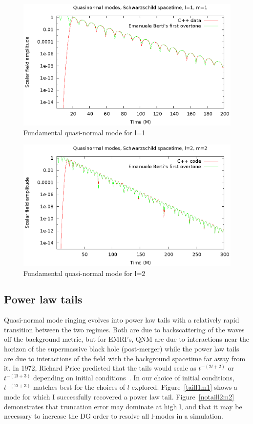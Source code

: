 \begin{figure}
  \includegraphics{l1m1qnm}
  \caption{Fundamental quasi-normal mode for l=1}
  \label{qnml1m1}
\end{figure}

\begin{figure}
  \includegraphics{l2m2qnm}
  \caption{Fundamental quasi-normal mode for l=2}
  \label{qnml2m2}
\end{figure}


\subsection{Power law tails}

Quasi-normal mode ringing evolves into power law tails with a relatively rapid transition between the two regimes. Both are due to backscattering of the waves off the background metric, but for EMRI's, QNM are due to interactions near the horizon of the supermassive black hole (post-merger) while the power law tails are due to interactions of the field with the background spacetime far away from it. In 1972, Richard Price predicted that the tails would scale as $t^{-(2l+2)}$ or $t^{-(2l+3)}$ depending on initial conditions~\cite{PriceTails}. In our choice of initial conditions, $t^{-(2l+3)}$ matches best for the choices of $l$ explored. Figure~\ref{taill1m1} shows a mode for which I successfully recovered a power law tail. Figure~\ref{notaill2m2} demonstrates that truncation error may dominate at high l, and that it may be necessary to increase the DG order to resolve all l-modes in a simulation.

